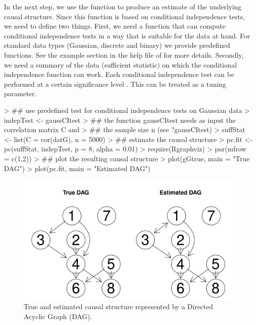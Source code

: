 \documentclass[article]{jss}
\begin{document}
In the next step, we use the function  to produce an estimate of
the underlying causal structure. Since this function is based on
conditional independence tests, we need to define two things. First, we
need a function that can compute conditional independence tests in a way
that is suitable for the data at hand. For standard data types (Gaussian,
discrete and binary) we provide predefined functions. See the example
section in the help file of  for more details. Secondly, we need a
summary of the data (sufficient statistic) on which the conditional
independence function can work. Each conditional independence test can be
performed at a certain significance level . This can be
treated as a tuning parameter.

\begin{Schunk}
\begin{Sinput}
> ## use predefined test for conditional independence tests on Gaussian data
> indepTest <- gaussCItest 
> ## the function gaussCItest needs as input the correlation matrix C and 
> ## the sample size n (see ?gaussCItest)
> suffStat <- list(C = cor(datG), n = 5000)
> ## estimate the causal structure
> pc.fit <- pc(suffStat, indepTest, p = 8, alpha = 0.01)
> require(Rgraphviz)
> par(mfrow = c(1,2))
> ## plot the resulting causal structure
> plot(gGtrue, main = "True DAG")
> plot(pc.fit, main = "Estimated DAG")
\end{Sinput}
\end{Schunk}

\begin{figure}
  \begin{center}
\includegraphics{pcalgDoc-exIntroPlot}
\caption{True and estimated causal structure represented by a Directed
  Acyclic Graph (DAG).}
\label{fig:intro1}
\end{center}
\end{figure}
\end{document}
